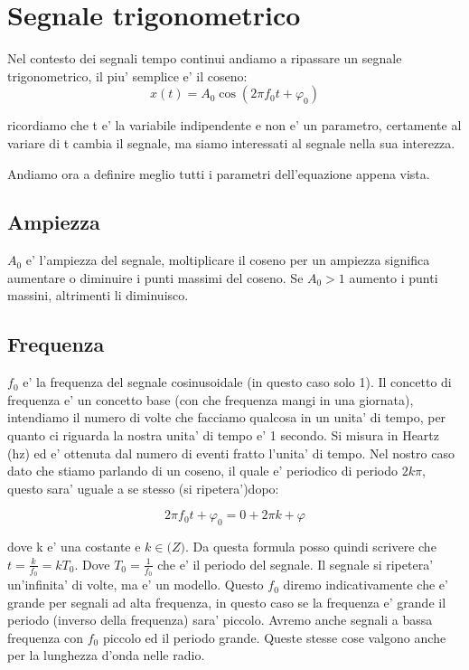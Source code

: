\section{Segnale trigonometrico}
Nel contesto dei segnali tempo continui andiamo a ripassare un segnale trigonometrico, il piu' semplice e' il coseno:
\begin{equation}
    x(t) = A_0 \cos(2\pi f_0 t + \varphi_0)
\end{equation}

ricordiamo che t e' la variabile indipendente e non e' un parametro, certamente al variare di t cambia il segnale, ma siamo interessati al segnale nella sua interezza.

Andiamo ora a definire meglio tutti i parametri dell'equazione appena vista.

\subsection{Ampiezza}
 $A_0$ e' l'ampiezza del segnale, moltiplicare il coseno per un ampiezza significa aumentare o diminuire i punti massimi del coseno. Se $A_0 > 1 $ aumento i punti massini, altrimenti li diminuisco.

\subsection{Frequenza}
$f_0$ e' la frequenza del segnale cosinusoidale (in questo caso solo 1). Il concetto di frequenza e' un concetto base (con che frequenza mangi in una giornata), intendiamo il numero di volte che facciamo qualcosa in un unita' di tempo, per quanto ci riguarda la nostra unita' di tempo e' 1 secondo. Si misura in Heartz (hz) ed e' ottenuta dal numero di eventi fratto l'unita' di tempo. Nel nostro caso dato che stiamo parlando di un coseno, il quale e' periodico di periodo $2 k \pi$, questo sara' uguale a se stesso (si ripetera')dopo:

\begin{equation}
    2\pi f_0 t + \varphi_0 = 0 + 2 \pi k + \varphi
\end{equation}

dove k e' una costante e $k \in \mathbb(Z)$.
Da questa formula posso quindi scrivere che $t =\frac{k}{f_0} = k T_0$.
Dove $T_0 = \frac{1}{f_0}$ che e' il periodo del segnale.
Il segnale si ripetera' un'infinita' di volte, ma e' un modello.
Questo $f_0$ diremo indicativamente che e' grande per segnali ad alta frequenza, in questo caso se la frequenza e' grande il periodo (inverso della frequenza) sara' piccolo. Avremo anche segnali a bassa frequenza con $f_0$ piccolo ed il periodo grande. Queste stesse cose valgono anche per la lunghezza d'onda nelle radio.

